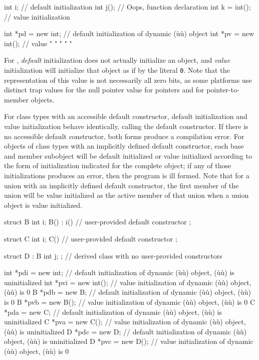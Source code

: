 \begin{emcppslisting}
int i;          // default initialization
int j();        // Oops, function declaration
int k = int();  // value initialization

int *pd = new int;    // default initialization of dynamic (ù{}ù) object
int *pv = new int();  // value        "         "     "      "    "
\end{emcppslisting}
    

\noindent For , \emph{default} initialization does not
actually initialize an object, and \emph{value} initialization will
initialize that object as if by the literal \lstinline!0!. Note that the
representation of this value is not necessarily all zero bits, as some
platforms use distinct trap values for the null pointer value for
pointers and for pointer-to-member objects.

For class types with an accessible  default
constructor, default initialization and value initialization behave
identically, calling the default constructor. If there is no accessible
default constructor, both forms produce a compilation error. For objects
of class types with an implicitly defined default constructor, each base
and member subobject will be default initialized or value initialized
according to the form of initialization indicated for the complete
object; if any of those initializations produces an error, then the
program is ill formed. Note that for a union with an implicitly defined
default constructor, the first member of the union will be value
initialized as the active member of that union when a union object is
value initialized.

\begin{emcppslisting}[emcppsbatch=e1]
struct B
{
    int i;
    B() : i() { }  // user-provided default constructor
};

struct C
{
    int i;
    C() { }  // user-provided default constructor
};

struct D : B { int j; };  // derived class with no user-provided constructors

int *pdi = new int;    // default initialization of dynamic (ù{}ù) object, (ù{}ù) is uninitialized
int *pvi = new int();  // value   initialization of dynamic (ù{}ù) object, (ù{}ù) is 0
B *pdb = new B;        // default initialization of dynamic (ù{}ù) object, (ù{}ù) is 0
B *pvb = new B();      // value   initialization of dynamic (ù{}ù) object, (ù{}ù) is 0
C *pda = new C;        // default initialization of dynamic (ù{}ù) object, (ù{}ù) is uninitialized
C *pva = new C();      // value   initialization of dynamic (ù{}ù) object, (ù{}ù) is uninitialized
D *pdc = new D;        // default initialization of dynamic (ù{}ù) object, (ù{}ù) is uninitialized
D *pvc = new D();      // value   initialization of dynamic (ù{}ù) object, (ù{}ù) is 0
\end{emcppslisting}
    

